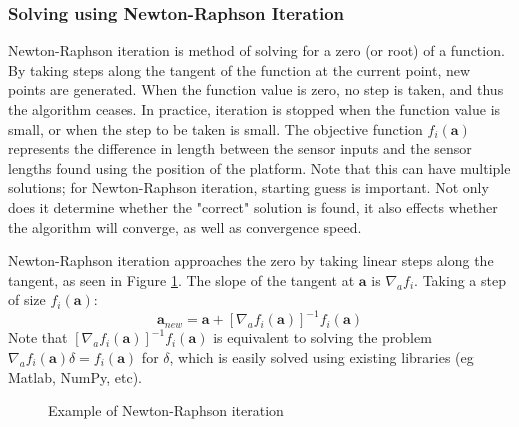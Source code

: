 \documentclass[]{article}
\newcommand\vect[1]{\bm{#1}} %
\begin{document}
		\subsubsection{Solving using Newton-Raphson Iteration}
		\par
			Newton-Raphson iteration is method of solving for a zero (or root) of a function. By taking steps along the tangent of the function at the current point, new points are generated. When the function value is zero, no step is taken, and thus the algorithm ceases. In practice, iteration is stopped when the function value is small, or when the step to be taken is small. The objective function $f_i \left(\vect{a}\right)$ represents the difference in length between the sensor inputs and the sensor lengths found using the position of the platform. Note that this can have multiple solutions; for Newton-Raphson iteration, starting guess is important. Not only does it determine whether the "correct" solution is found, it also effects whether the algorithm will converge, as well as convergence speed.
		\par
			Newton-Raphson iteration approaches the zero by taking linear steps along the tangent, as seen in Figure \ref{fig:newton-raphson-example}. The slope of the tangent at $\vect{a}$ is $\nabla_{a} f_i$. Taking a step of size $f_i\left(\vect{a}\right)$:
			$$ \vect{a}_{new} = \vect{a} + \left[\nabla_{a} f_i\left(\vect{a}\right)\right]^{-1} f_i\left(\vect{a}\right) $$
			Note that $\left[\nabla_{a} f_i\left(\vect{a}\right)\right]^{-1} f_i\left(\vect{a}\right)$ is equivalent to solving the problem $\nabla_{a} f_i\left(\vect{a}\right) \delta = f_i\left(\vect{a}\right)$ for $\delta$, which is easily solved using existing libraries (eg Matlab, NumPy, etc).
			\begin{figure}
			\centering
			
			\caption{Example of Newton-Raphson iteration}
			\label{fig:newton-raphson-example}
			\end{figure}
				
\end{document}
